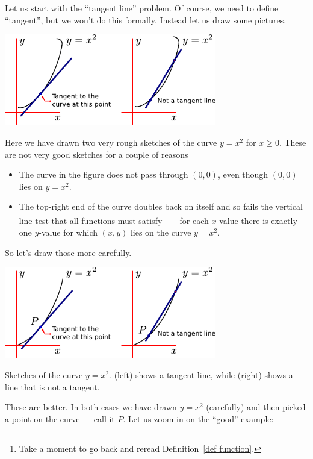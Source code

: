 Let us start with the ``tangent line'' problem. Of course, we need to define
``tangent'', but we won't do this formally. Instead let us draw some pictures.
\begin{fig}
\begin{center}
 \includegraphics[height=4cm]{tang1}
\end{center}
\end{fig}
Here we have drawn two very rough sketches of the curve $y=x^2$ for $x \geq 0$.
These are not very good sketches for a couple of reasons
\begin{itemize}
 \item The curve in the figure does not pass through $(0,0)$, even though
$(0,0)$ lies on $y=x^2$.
 \item The top-right end of the curve doubles back on itself and so fails the
vertical line test  that all functions must satisfy\footnote{Take a moment to
go back and reread Definition~\ref{def function}.} --- for each $x$-value there
is exactly one $y$-value for which $(x,y)$ lies on the curve $y=x^2$.
\end{itemize}
So let's draw those more carefully.
\begin{fig}
\begin{center}
 \includegraphics[height=4cm]{tang1a}
\end{center}
{Sketches of the curve $y=x^2$. (left) shows a tangent line, while
(right) shows a line that is not a tangent.}
\label{fig tang1a}
\end{fig}
These are better. In both cases we have drawn $y=x^2$ (carefully) and then
picked a point on the curve --- call it $P$. Let us zoom in on the ``good''
example:
